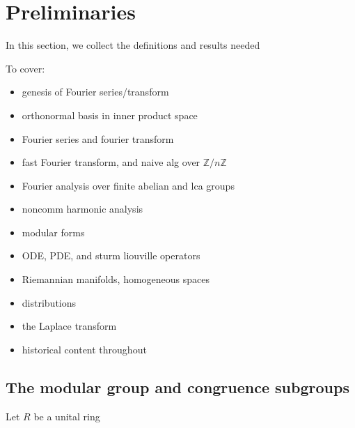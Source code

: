 \documentclass[10pt,leqno]{article}
\begin{document}
\newpage\section{Preliminaries} In this section, we collect the definitions and results needed

To cover: \begin{itemize}
    \item genesis of Fourier series/transform
    \item orthonormal basis in inner product space
    \item Fourier series and fourier transform
    \item fast Fourier transform, and naive alg over $\mathbb{Z}/n\mathbb{Z}$
    \item Fourier analysis over finite abelian and lca groups
    \item noncomm harmonic analysis
    \item modular forms
    \item ODE, PDE, and sturm liouville operators
    \item Riemannian manifolds, homogeneous spaces
    \item distributions
    \item the Laplace transform
    \item historical content throughout
\end{itemize}\newpage %
\subsection{The modular group and congruence subgroups}
Let $R$ be a unital ring

\newpage\pagestyle{frontmatter}
\begin{bibdiv}
\begin{biblist}
\end{biblist}
\end{bibdiv}
\end{document}
